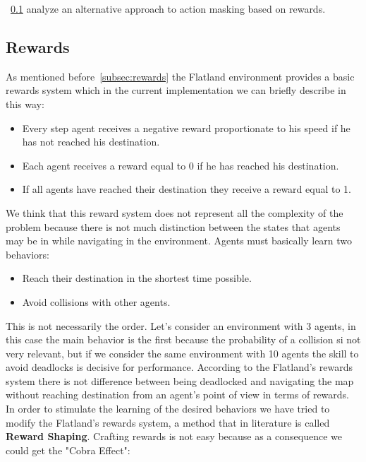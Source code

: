 \documentclass[11pt, a4paper, hidelinks]{report}
\begin{document}
~\ref{subsec:rewards2} analyze an alternative approach to action masking based on rewards.

\subsection{Rewards}\label{subsec:rewards2}

As mentioned before~\ref{subsec:rewards} the Flatland environment provides a basic rewards system which in the current implementation we can briefly describe in this way:
\begin{itemize}
	\item Every step agent receives a negative reward proportionate to his speed if he has not reached his destination.
	\item Each agent receives a reward equal to 0 if he has reached his destination.
	\item If all agents have reached their destination they receive a reward equal to 1.
\end{itemize}
We think that this reward system does not represent all the complexity of the problem because there is not much distinction between the states that agents may be in while navigating in the environment.
Agents must basically learn two behaviors:
\begin{itemize}
	\item Reach their destination in the shortest time possible.
	\item Avoid collisions with other agents.
\end{itemize}
This is not necessarily the order.
Let's consider an environment with 3 agents, in this case the main behavior is the first because the probability of a collision si not very relevant, but if we consider the same environment with 10 agents the skill to avoid deadlocks is decisive for performance.
According to the Flatland's rewards system there is not difference between being deadlocked and navigating the map without reaching destination from an agent's point of view in terms of rewards.
In order to stimulate the learning of the desired behaviors we have tried to modify the Flatland's rewards system, a method that in literature is called \textbf{Reward Shaping}.
Crafting rewards is not easy because as a consequence we could get the "Cobra Effect":
\end{document}

